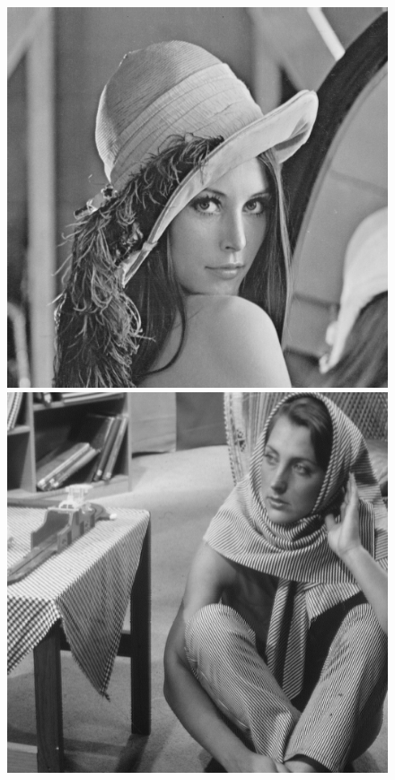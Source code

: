 \documentclass{article}
\begin{document}
\begin{figure}[!htb]
\centering
\includegraphics[scale=0.2]{img/lena_8bit.png}
\includegraphics[scale=0.2]{img/barbara_8bit.png}   

\end{figure}
\end{document}
